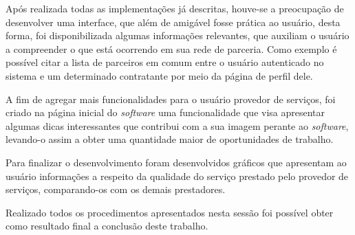 \par Após realizada todas as implementações já descritas, houve-se a preocupação de desenvolver uma interface, que além de amigável fosse prática ao usuário, desta forma, foi disponibilizada algumas informações relevantes, que auxiliam o usuário a compreender o que está ocorrendo em sua rede de parceria. Como exemplo é possível citar a lista de parceiros em comum entre o usuário autenticado no sistema e um determinado contratante por meio da página de perfil dele.

\par A fim de agregar mais funcionalidades para o usuário provedor de serviços, foi criado na página inicial do \textit{software} uma funcionalidade que visa apresentar algumas dicas interessantes que contribui com a sua imagem perante ao \textit{software}, levando-o assim a obter uma quantidade maior de oportunidades de trabalho.

\par Para finalizar o desenvolvimento foram desenvolvidos gráficos que apresentam ao usuário informações a respeito da qualidade do serviço prestado pelo provedor de serviços, comparando-os com os demais prestadores.

\par Realizado todos os procedimentos apresentados nesta sessão foi possível obter como resultado final a conclusão deste trabalho.